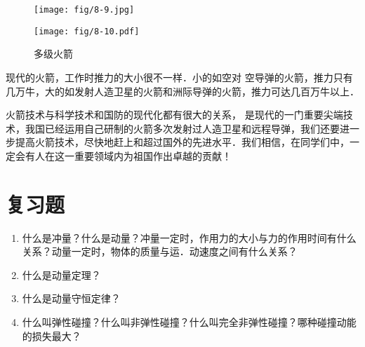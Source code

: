 \begin{figure}[htp]
\centering
\begin{minipage}[t]{0.48\textwidth}
\centering
\texttt{[image: fig/8-9.jpg]}
\caption{}
\end{minipage}
\begin{minipage}[t]{0.48\textwidth}
\centering
\texttt{[image: fig/8-10.pdf]}
\caption{多级火箭}
\end{minipage}
\end{figure}


现代的火箭，工作时推力的大小很不一样．小的如空对
空导弹的火箭，推力只有几万牛，大的如发射人造卫星的火箭和洲际导弹的火箭，推力可达几百万牛以上．

火箭技术与科学技术和国防的现代化都有很大的关系，
是现代的一门重要尖端技术，我国已经运用自己研制的火箭多次发射过人造卫星和远程导弹，我们还要进一步提高火箭技术，尽快地赶上和超过国外的先进水平．我们相信，在同学们中，一定会有人在这一重要领域内为祖国作出卓越的贡献！


\section*{复习题}
\begin{enumerate}
    \item 什么是冲量？什么是动量？冲量一定时，作用力的大小与力的作用时间有什么关系？动量一定时，物体的质量与运．动速度之间有什么关系？
    \item 什么是动量定理？
    \item 什么是动量守恒定律？
    \item 什么叫弹性碰撞？什么叫非弹性碰撞？什么叫完全非弹性碰撞？哪种碰撞动能的损失最大？
\end{enumerate}


